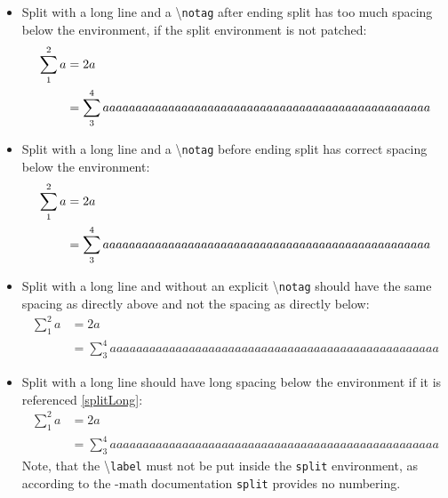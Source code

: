 \documentclass{article}
\begin{document}
\begin{itemize}
		\item Split with a long line and a \textbackslash\texttt{notag} after ending split has too much spacing below the environment, if the split environment is not patched:
			\begin{equation}
				\begin{split}
					\sum_1^2 a &= 2a\\
							&= \sum_3^4 aaaaaaaaaaaaaaaaaaaaaaaaaaaaaaaaaaaaaaaaaaaaaaaaaa
				\end{split}\notag
			\end{equation}
		\item Split with a long line and a \textbackslash\texttt{notag} before ending split has correct spacing below the environment:
			\begin{equation}
				\begin{split}
					\sum_1^2 a &= 2a\\
							&= \sum_3^4 aaaaaaaaaaaaaaaaaaaaaaaaaaaaaaaaaaaaaaaaaaaaaaaaaa\notag
				\end{split}
			\end{equation}
		\item Split with a long line and without an explicit \textbackslash\texttt{notag} should have the same spacing as directly above and not the spacing as directly below:
			\begin{equation}
				\begin{split}
					\sum_1^2 a &= 2a\\
							&= \sum_3^4 aaaaaaaaaaaaaaaaaaaaaaaaaaaaaaaaaaaaaaaaaaaaaaaaaa
				\end{split}
			\end{equation}
		\item Split with a long line should have long spacing below the environment if it is referenced \ref{splitLong}:
			\begin{equation}\label{splitLong}
				\begin{split}
					\sum_1^2 a &= 2a\\
							&= \sum_3^4 aaaaaaaaaaaaaaaaaaaaaaaaaaaaaaaaaaaaaaaaaaaaaaaaaa
				\end{split}
			\end{equation}
			Note, that the \textbackslash\texttt{label} must not be put inside the \texttt{split} environment, as according to the \AmS-math documentation \texttt{split} provides no numbering.
	\end{itemize}
\end{document}
